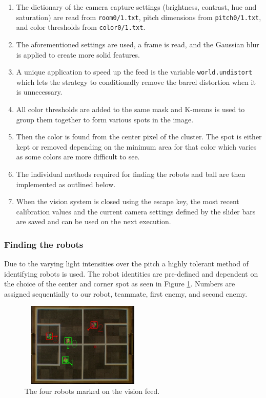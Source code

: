 \documentclass[a4paper,12pt]{article}
\begin{document}
\begin{enumerate}
\item The dictionary of the camera capture settings (brightness, contrast, hue and saturation) are read from \texttt{room0/1.txt}, pitch dimensions from \texttt{pitch0/1.txt}, and color thresholds from \texttt{color0/1.txt}.
\item The aforementioned settings are used, a frame is read, and the Gaussian blur is applied to create more solid features.
\item A unique application to speed up the feed is the variable \texttt{world.undistort} which lets the strategy to conditionally remove the barrel distortion when it is unnecessary.
\item All color thresholds are added to the same mask and K-means is used to group them together to form various spots in the image.
\item Then the color is found from the center pixel of the cluster. The spot is either kept or removed depending on the minimum area for that color which varies as some colors are more difficult to see.
\item The individual methods required for finding the robots and ball are then implemented as outlined below.
\item When the vision system is closed using the escape key, the most recent calibration values and the current camera settings defined by the slider bars are saved and can be used on the next execution.
\end{enumerate}

\subsubsection{Finding the robots}

Due to the varying light intensities over the pitch a highly tolerant method of identifying robots is used. The robot identities are pre-defined and dependent on the choice of the center and corner spot as seen in Figure \ref{fig:robots}. Numbers are assigned sequentially to our robot, teammate, first enemy, and second enemy.

\begin{figure}
\centering
\includegraphics[height=40mm,width=60mm]{ex1.jpg}
\caption{The four robots marked on the vision feed.}
\label{fig:robots}
\end{figure}
\end{document}
